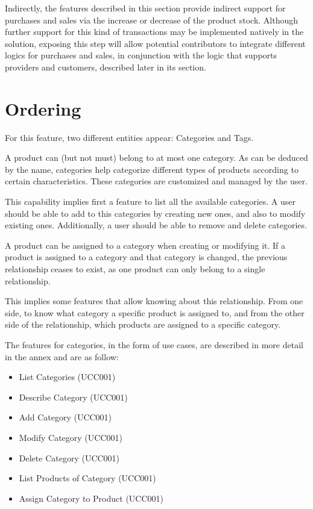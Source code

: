 Indirectly, the features described in this section provide indirect support for purchases and sales via the increase or decrease of the product stock. Although further support for this kind of transactions may be implemented natively in the solution, exposing this step will allow potential contributors to integrate different logics for purchases and sales, in conjunction with the logic that supports providers and customers, described later in its section.

\section{Ordering}
For this feature, two different entities appear: Categories and Tags. 

A product can (but not must) belong to at most one category. As can be deduced by the name, categories help categorize different types of products according to certain characteristics. These categories are customized and managed by the user.

This capability implies first a feature to list all the available categories. A user should be able to add to this categories by creating new ones, and also to modify existing ones. Additionally, a user should be able to remove and delete categories.

A product can be assigned to a category when creating or modifying it. If a product is assigned to a category and that category is changed, the previous relationship ceases to exist, as one product can only belong to a single relationship. 

This implies some features that allow knowing about this relationship. From one side, to know what category a specific product is assigned to, and from the other side of the relationship, which products are assigned to a specific category.

The features for categories, in the form of use cases, are described in more detail in the annex and are as follow:

\begin{itemize}
\item List Categories (UCC001)
\item Describe Category (UCC001)
\item Add Category (UCC001)
\item Modify Category (UCC001)
\item Delete Category (UCC001)
\item List Products of Category (UCC001)
\item Assign Category to Product (UCC001)
\end{itemize}

